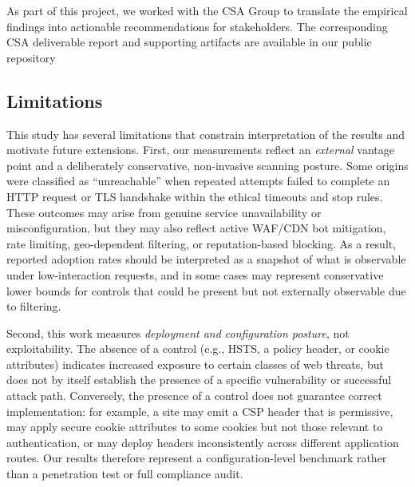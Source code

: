 \documentclass[a4paper,fleqn]{cas-sc}
\begin{document}

As part of this project, we worked with the CSA Group to translate the empirical findings into actionable recommendations for stakeholders. 
The corresponding CSA deliverable report and supporting artifacts are available in our public repository~\cite{latta_scanner_2026}

\subsection{Limitations}\label{sec:limitations}

This study has several limitations that constrain interpretation of the results and motivate future extensions. 
First, our measurements reflect an \emph{external} vantage point and a deliberately conservative, non-invasive scanning posture. Some origins were classified as ``unreachable'' when repeated attempts failed to complete an HTTP request or TLS handshake within the ethical timeouts and stop rules. 
These outcomes may arise from genuine service unavailability or misconfiguration, but they may also reflect active WAF/CDN bot mitigation, rate limiting, geo-dependent filtering, or reputation-based blocking. 
As a result, reported adoption rates should be interpreted as a snapshot of what is observable under low-interaction requests, and in some cases may represent conservative lower bounds for controls that could be present but not externally observable due to filtering.

Second, this work measures \emph{deployment and configuration posture}, not exploitability. 
The absence of a control (e.g., HSTS, a policy header, or cookie attributes) indicates increased exposure to certain classes of web threats, but does not by itself establish the presence of a specific vulnerability or successful attack path. 
Conversely, the presence of a control does not guarantee correct implementation: for example, a site may emit a CSP header that is permissive, may apply secure cookie attributes to some cookies but not those relevant to authentication, or may deploy headers inconsistently across different application routes. 
Our results therefore represent a configuration-level benchmark rather than a penetration test or full compliance audit. 
\end{document}
